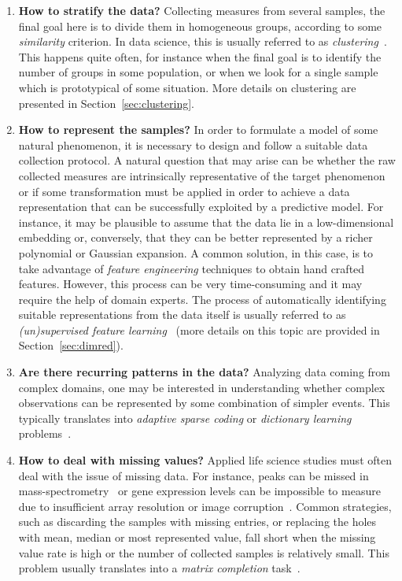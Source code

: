 \begin{enumerate}
	\item[] \textbf{How to stratify the data?}
	Collecting measures from several samples, the final goal here is to divide them in homogeneous groups, according to some \textit{similarity} criterion. In data science, this is usually referred to as \textit{clustering}~\cite{hastie2009elements}.
	This happens quite often, for instance when the final goal is to identify the number of groups in some population, or when we look for a single sample which is prototypical of some situation. More details on clustering are presented in Section~\ref{sec:clustering}.
	
	\item[] \textbf{How to represent the samples?}
	In order to formulate a model of some natural phenomenon, it is necessary to design and follow a suitable data collection protocol. A natural question that may arise can be whether the raw collected measures are intrinsically representative of the target phenomenon or if some transformation must be applied in order to achieve a data representation that can be successfully exploited by a predictive model. For instance, it may be plausible to assume that the data lie in a low-dimensional embedding or, conversely, that they can be better represented by a richer polynomial or Gaussian expansion.
	A common solution, in this case, is to take advantage of \textit{feature engineering} techniques to obtain hand crafted features. However, this process can be very time-consuming and it may require the help of domain experts. The process of automatically identifying suitable representations from the data itself is usually referred to as \textit{(un)supervised feature learning}~\cite{angermueller2016deep, mamoshina2016applications} (more details on this topic are provided in Section~\ref{sec:dimred}).
	
	
	\item[] \textbf{Are there recurring patterns in the data?}
	Analyzing data coming from complex domains, one may be interested in understanding whether complex observations can be represented by some combination of simpler events. This typically translates into \textit{adaptive sparse coding} or \textit{dictionary learning} problems~\cite{masecchia2015genome, alexandrov2013signatures}.
	
	
	\item[] \textbf{How to deal with missing values?}
	Applied life science studies must often deal with the issue of missing data. For instance, peaks can be missed in mass-spectrometry~\cite{jung2014adaption} or gene expression levels can be impossible to measure due to insufficient array resolution or image corruption~\cite{stekhoven2011missforest, troyanskaya2001missing}. Common strategies, such as discarding the samples with missing entries, or replacing the holes with mean, median or most represented value, fall short when the missing value rate is high or the number of collected samples is relatively small. This problem usually translates into a \textit{matrix completion} task~\cite{candes2009exact}.
	
\end{enumerate}


